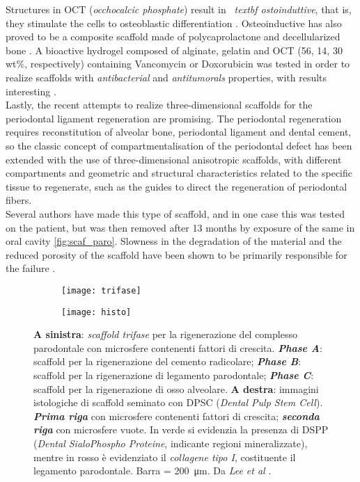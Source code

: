 Structures in OCT (\emph{occhocalcic phosphate}) result in \emph{\ textbf {ostoinduttive}}, that is, they stimulate the cells to osteoblastic differentiation \parencite{Reference130}. Osteoinductive has also proved to be a composite scaffold made of polycaprolactone and decellularized bone \parencite{Reference132}. A bioactive hydrogel composed of alginate, gelatin and OCT (56, 14, 30 wt\%, respectively) containing Vancomycin or Doxorubicin was tested in order to realize scaffolds with \emph{antibacterial} and \emph{antitumorals} properties, with results interesting \parencite{Reference133}. \\
Lastly, the recent attempts to realize three-dimensional scaffolds for the periodontal ligament regeneration are promising. The periodontal regeneration requires reconstitution of alveolar bone, periodontal ligament and dental cement, so the classic concept of compartmentalisation of the periodontal defect has been extended with the use of three-dimensional anisotropic scaffolds, with different compartments and geometric and structural characteristics related to the specific tissue to regenerate, such as the guides to direct the regeneration of periodontal fibers. \\
Several authors have made this type of scaffold, and in one case this was tested on the patient, but was then removed after 13 months by exposure of the same in oral cavity \ref{fig:scaf_paro}. Slowness in the degradation of the material and the reduced porosity of the scaffold have been shown to be primarily responsible for the failure \parencite{Reference134}. \\
\begin{figure}[h!]
 
\begin{subfigure}{0.5\textwidth}
\centering
\texttt{[image: trifase]} 
\label{fig:trifase}
\end{subfigure}
\begin{subfigure}{0.5\textwidth}
\centering
\texttt{[image: histo]}
\label{fig:histo}
\end{subfigure}
\caption{\textbf{A sinistra}: \emph{scaffold trifase} per la rigenerazione del complesso parodontale con microsfere contenenti fattori di crescita. \emph{\textbf{Phase A}}: scaffold per la rigenerazione del cemento radicolare; \emph{\textbf{Phase B}}: scaffold per la rigenerazione di legamento parodontale; \emph{\textbf{Phase C}}: scaffold per la rigenerazione di osso alveolare. \textbf{A destra}: immagini istologiche di scaffold seminato con DPSC (\emph{Dental Pulp Stem Cell}). \emph{\textbf{Prima riga}} con microsfere contenenti fattori di crescita; \emph{\textbf{seconda riga}} con microsfere vuote. In verde si evidenzia la presenza di DSPP (\emph{Dental SialoPhospho Proteine}, indicante regioni mineralizzate), mentre in rosso è evidenziato il \emph{collagene tipo I}, costituente il legamento parodontale. Barra = \SI {200} {\micro\metre}. Da \emph{Lee et al} \parencite{Reference135}.}
\label{fig:scaffold_trifase}
\end{figure}
\pagebreak

